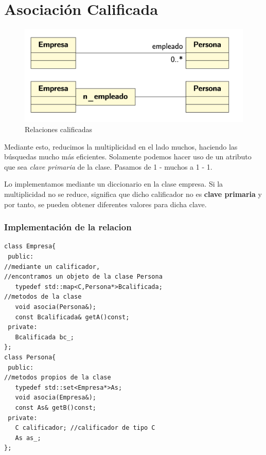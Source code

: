 \chapter{Asociación Calificada}
\begin{figure}[h]
\vspace{-.5cm}
	\centering
	\includegraphics[width=\textwidth]{Imagenes/asc.png}
	\caption{Relaciones calificadas}
\end{figure}
Mediante esto, reducimos la multiplicidad en el lado muchos, haciendo las búsquedas mucho más eficientes.
Solamente podemos hacer uso de un atributo que sea \textit{clave primaria} de la clase.
Pasamos de 1 - muchos a 1 - 1.

Lo implementamos mediante un diccionario en la clase empresa.
Si la multiplicidad no se reduce, significa que dicho calificador no es \textbf{clave primaria} y por tanto, se pueden obtener diferentes valores para dicha clave.
\subsection{Implementación de la relacion}
\begin{center}
	\begin{lstlisting}[frame=single]
class Empresa{
 public:
//mediante un calificador, 
//encontramos un objeto de la clase Persona
   typedef std::map<C,Persona*>Bcalificada; 
//metodos de la clase
   void asocia(Persona&);
   const Bcalificada& getA()const;
 private:
   Bcalificada bc_;
};
class Persona{
 public:
//metodos propios de la clase
   typedef std::set<Empresa*>As;
   void asocia(Empresa&);
   const As& getB()const;
 private:
   C calificador; //calificador de tipo C
   As as_;
};
\end{lstlisting}
\end{center}